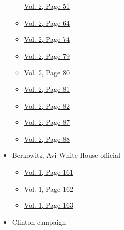 \begin{itemize}
\begin{itemize}
    \protect\hyperlink{g-page-263}{Vol. 2, Page 51}
  \item
    \protect\hyperlink{g-page-276}{Vol. 2, Page 64}
  \item
    \protect\hyperlink{g-page-286}{Vol. 2, Page 74}
  \item
    \protect\hyperlink{g-page-291}{Vol. 2, Page 79}
  \item
    \protect\hyperlink{g-page-292}{Vol. 2, Page 80}
  \item
    \protect\hyperlink{g-page-293}{Vol. 2, Page 81}
  \item
    \protect\hyperlink{g-page-294}{Vol. 2, Page 82}
  \item
    \protect\hyperlink{g-page-299}{Vol. 2, Page 87}
  \item
    \protect\hyperlink{g-page-300}{Vol. 2, Page 88}
  \end{itemize}
\item
  Berkowitz, Avi White House official

  \begin{itemize}
  \tightlist
  \item
    \protect\hyperlink{g-page-169}{Vol. 1, Page 161}
  \item
    \protect\hyperlink{g-page-170}{Vol. 1, Page 162}
  \item
    \protect\hyperlink{g-page-171}{Vol. 1, Page 163}
  \end{itemize}
\item
  Clinton campaign


\end{itemize}
